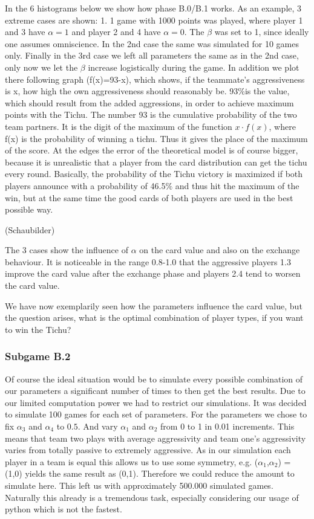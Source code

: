 In the 6 histograms below we show how phase B.0/B.1 works. As an example, 3 extreme cases are shown: 1. 1 game with 1000 points was played, where player 1 and 3 have $\alpha = 1$ and player 2 and 4 have $\alpha=0$. The $\beta$ was set to 1, since ideally one assumes omniscience. In the 2nd case the same was simulated for 10 games only. Finally in the 3rd case we left all parameters the same as in the 2nd case, only now we let the $\beta$ increase logistically during the game. In addition we plot there following graph (f(x)=93-x), which shows, if the teammate's aggressiveness is x, how high the own aggressiveness should reasonably be.
93$\%$is the value, which should result from the added aggressions, in order to achieve maximum points with the Tichu. The number 93 is the cumulative probability of the two team partners. It is the digit of the maximum of the function $x\cdot f(x)$, where f(x) is the probability of winning a tichu. Thus it gives the place of the maximum of the score.
At the edges the error of the theoretical model is of course bigger, because it is unrealistic that a player from the card distribution can get the tichu every round. 
Basically, the probability of the Tichu victory is maximized if both players announce with a probability of 46.5$\%$ and thus hit the maximum of the win, but at the same time the good cards of both players are used in the best possible way.

(Schaubilder)

The 3 cases show the influence of $\alpha$ on the card value and also on the exchange behaviour. It is noticeable in the range 0.8-1.0 that the aggressive players 1.3 improve the card value after the exchange phase and players 2.4 tend to worsen the card value.

We have now exemplarily seen how the parameters influence the card value, but the question arises, what is the optimal combination of player types, if you want to win the Tichu?

\subsubsection{Subgame B.2}
Of course the ideal situation would be to simulate every possible combination of our parameters a significant number of times to then get the best results. Due to our limited computation power we had to restrict our simulations. It was decided to simulate 100 games for each set of parameters. For the parameters we chose to fix $\alpha_3$ and $\alpha_4$ to $0.5$. And vary $\alpha_1$ and $\alpha_2$ from 0 to 1 in 0.01 increments. This means that team two plays with average aggressivity and team one’s aggressivity varies from totally passive to extremely aggressive. As in our simulation each player in a team is equal this allows us to use some symmetry, e.g. ($\alpha_1$,$\alpha_2$) = (1,0) yields the same result as (0,1). Therefore we could reduce the amount to simulate here. This left us with approximately 500.000 simulated games. Naturally this already is a tremendous task, especially considering our usage of python which is not the fastest.

